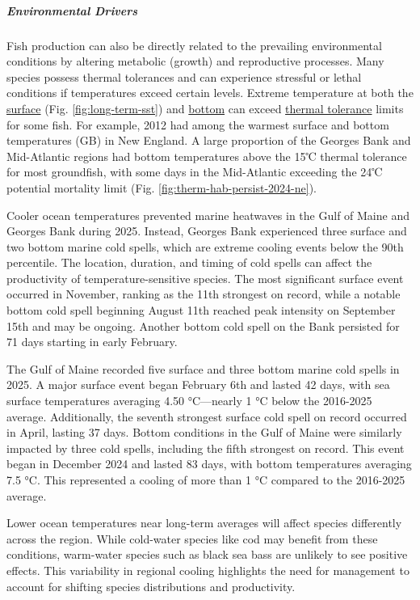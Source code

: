 \documentclass[
  10pt,
]{article}
\begin{document}
\subparagraph{Environmental Drivers}\label{environmental-drivers}

Fish production can also be directly related to the prevailing environmental conditions by altering metabolic (growth) and reproductive processes. Many species possess thermal tolerances and can experience stressful or lethal conditions if temperatures exceed certain levels. Extreme temperature at both the \href{https://noaa-edab.github.io/catalog/seasonal_oisst_anom.html}{surface} (Fig. \ref{fig:long-term-sst}) and \href{https://noaa-edab.github.io/catalog/bottom_temp_model_anom.html}{bottom} can exceed \href{https://noaa-edab.github.io/catalog/thermal_habitat_gridded.html}{thermal tolerance} limits for some fish. For example, 2012 had among the warmest surface and bottom temperatures (GB) in New England. A large proportion of the Georges Bank and Mid-Atlantic regions had bottom temperatures above the 15℃ thermal tolerance for most groundfish, with some days in the Mid-Atlantic exceeding the 24℃ potential mortality limit (Fig. \ref{fig:therm-hab-persist-2024-ne}).

Cooler ocean temperatures prevented marine heatwaves in the Gulf of Maine and Georges Bank during 2025. Instead, Georges Bank experienced three surface and two bottom marine cold spells, which are extreme cooling events below the 90th percentile. The location, duration, and timing of cold spells can affect the productivity of temperature-sensitive species. The most significant surface event occurred in November, ranking as the 11th strongest on record, while a notable bottom cold spell beginning August 11th reached peak intensity on September 15th and may be ongoing. Another bottom cold spell on the Bank persisted for 71 days starting in early February.

The Gulf of Maine recorded five surface and three bottom marine cold spells in 2025. A major surface event began February 6th and lasted 42 days, with sea surface temperatures averaging 4.50 °C---nearly 1 °C below the 2016-2025 average. Additionally, the seventh strongest surface cold spell on record occurred in April, lasting 37 days. Bottom conditions in the Gulf of Maine were similarly impacted by three cold spells, including the fifth strongest on record. This event began in December 2024 and lasted 83 days, with bottom temperatures averaging 7.5 °C. This represented a cooling of more than 1 °C compared to the 2016-2025 average.

Lower ocean temperatures near long-term averages will affect species differently across the region. While cold-water species like cod may benefit from these conditions, warm-water species such as black sea bass are unlikely to see positive effects. This variability in regional cooling highlights the need for management to account for shifting species distributions and productivity.
\end{document}
